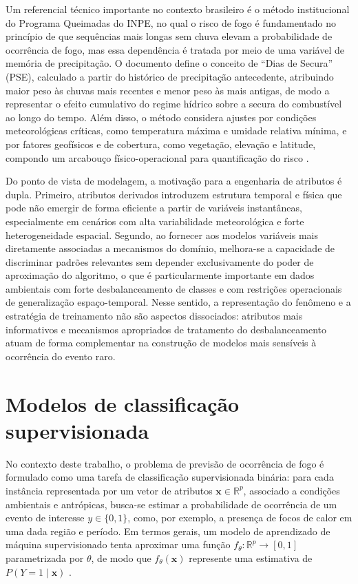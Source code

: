 Um referencial técnico importante no contexto brasileiro é o método institucional do Programa Queimadas do INPE, no qual o risco de fogo é fundamentado no princípio de que sequências mais longas sem chuva elevam a probabilidade de ocorrência de fogo, mas essa dependência é tratada por meio de uma variável de memória de precipitação. O documento define o conceito de ``Dias de Secura'' (PSE), calculado a partir do histórico de precipitação antecedente, atribuindo maior peso às chuvas mais recentes e menor peso às mais antigas, de modo a representar o efeito cumulativo do regime hídrico sobre a secura do combustível ao longo do tempo. Além disso, o método considera ajustes por condições meteorológicas críticas, como temperatura máxima e umidade relativa mínima, e por fatores geofísicos e de cobertura, como vegetação, elevação e latitude, compondo um arcabouço físico-operacional para quantificação do risco \cite{setzer2019metodo}.

Do ponto de vista de modelagem, a motivação para a engenharia de atributos é dupla. Primeiro, atributos derivados introduzem estrutura temporal e física que pode não emergir de forma eficiente a partir de variáveis instantâneas, especialmente em cenários com alta variabilidade meteorológica e forte heterogeneidade espacial. Segundo, ao fornecer aos modelos variáveis mais diretamente associadas a mecanismos do domínio, melhora-se a capacidade de discriminar padrões relevantes sem depender exclusivamente do poder de aproximação do algoritmo, o que é particularmente importante em dados ambientais com forte desbalanceamento de classes e com restrições operacionais de generalização espaço-temporal. Nesse sentido, a representação do fenômeno e a estratégia de treinamento não são aspectos dissociados: atributos mais informativos e mecanismos apropriados de tratamento do desbalanceamento atuam de forma complementar na construção de modelos mais sensíveis à ocorrência do evento raro.

\section{Modelos de classificação supervisionada}

No contexto deste trabalho, o problema de previsão de ocorrência de fogo é formulado como uma tarefa de classificação supervisionada binária: para cada instância representada por um vetor de atributos $\mathbf{x} \in \mathbb{R}^p$, associado a condições ambientais e antrópicas, busca-se estimar a probabilidade de ocorrência de um evento de interesse $y \in \{0,1\}$, como, por exemplo, a presença de focos de calor em uma dada região e período. Em termos gerais, um modelo de aprendizado de máquina supervisionado tenta aproximar uma função $f_\theta : \mathbb{R}^p \rightarrow [0,1]$ parametrizada por $\theta$, de modo que $f_\theta(\mathbf{x})$ represente uma estimativa de $P(Y=1 \mid \mathbf{x})$ \cite{mitchell1997machine,russell2016artificial}.

